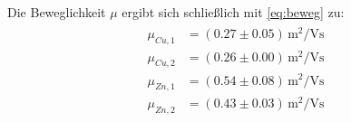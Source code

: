 Die Beweglichkeit $\mu$ ergibt sich schließlich mit \eqref{eq:beweg} zu:
\begin{align}
\begin{aligned}
\mu_{Cu,1} &= (0.27 \pm 0.05) \, \si{\meter^2 \per \volt \second}  \\%
\mu_{Cu,2} &= (0.26 \pm 0.00) \, \si{\meter^2 \per \volt \second}  \\
\mu_{Zn,1} &= (0.54 \pm 0.08) \, \si{\meter^2 \per \volt \second}  \\
\mu_{Zn,2} &= (0.43 \pm 0.03) \, \si{\meter^2 \per \volt \second}
\end{aligned}
\end{align}
